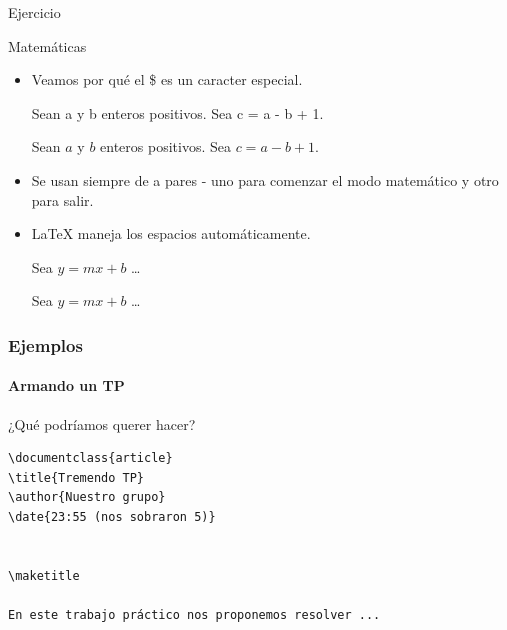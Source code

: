 \begin{frame}[fragile]{Ejercicio}

    
\end{frame}

\begin{frame}[fragile]{Matemáticas}
    \begin{itemize}
        \item Veamos por qué el \$ es un caracter especial.
        \small
        \begin{exampletwouptiny}
Sean a y b enteros positivos. 
Sea c = a - b + 1.

Sean $a$ y $b$ enteros positivos. 
Sea $c = a - b + 1$.
        \end{exampletwouptiny}
        \item Se usan siempre de a pares - uno para comenzar el modo matemático y otro para salir.
        \item \LaTeX{} maneja los espacios automáticamente.
            \begin{exampletwouptiny}
Sea $y=mx+b$ \ldots

Sea $y = m x + b$ \ldots
        \end{exampletwouptiny}
    \end{itemize}
\end{frame}

\begin{frame}[fragile]
\frametitle{Ejemplos}
\framesubtitle{Armando un TP}

¿Qué podríamos querer hacer?

\begin{lstlisting}[title={segundoTP.tex}]
\documentclass{article}
\title{Tremendo TP}
\author{Nuestro grupo}
\date{23:55 (nos sobraron 5)}


\maketitle

En este trabajo práctico nos proponemos resolver ...


\end{lstlisting}

\end{frame}

